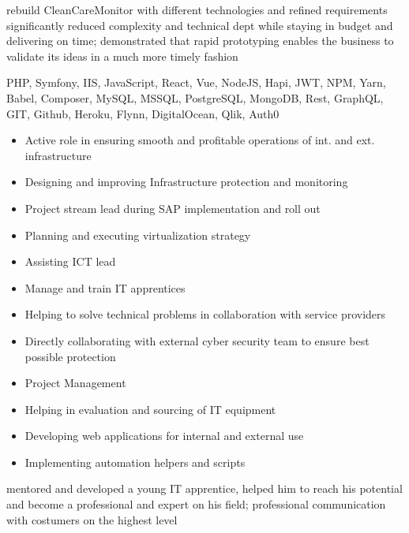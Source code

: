 \documentclass[9pt,a4paper]{altacv}
\begin{document}
rebuild CleanCareMonitor with different technologies and refined requirements significantly reduced complexity and technical dept while staying in budget and delivering on time;
demonstrated that rapid prototyping enables the business to validate its ideas in a much more timely fashion

PHP, Symfony, IIS,
JavaScript, React, Vue, NodeJS, Hapi, JWT, NPM, Yarn, Babel, Composer,
MySQL, MSSQL, PostgreSQL, MongoDB, Rest, GraphQL,
GIT, Github, Heroku, Flynn, DigitalOcean, Qlik, Auth0


\newpage
{}%

%

\begin{itemize}
\item Active role in ensuring smooth and profitable operations of int. and ext. infrastructure
\item Designing and improving Infrastructure protection and monitoring
\item Project stream lead during SAP implementation and roll out
\item Planning and executing virtualization strategy
\item Assisting ICT lead
\item Manage and train IT apprentices
\item Helping to solve technical problems in collaboration with service providers
\item Directly collaborating with external cyber security team to ensure best possible protection
\item Project Management
\item Helping in evaluation and sourcing of IT equipment
\item Developing web applications for internal and external use
\item Implementing automation helpers and scripts

\end{itemize}

mentored and developed a young IT apprentice, helped him to reach his potential and become a professional and expert on his field;
professional communication with costumers on the highest level
\end{document}
